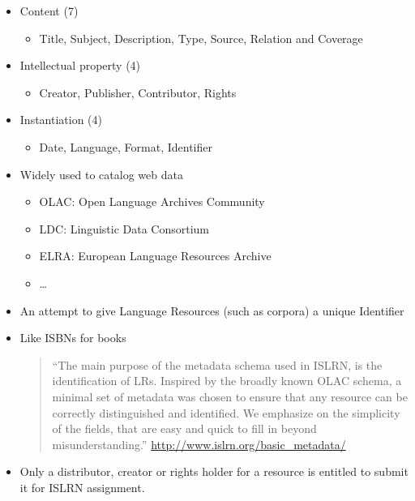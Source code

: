 \documentclass[a4paper,landscape,headrule,footrule,xetex]{foils}
\begin{document}
\MyLogo{}
\begin{itemize}
\item Content (7)
  \begin{itemize}
  \item Title, Subject, Description, Type, Source,
    Relation and Coverage
  \end{itemize}
\item Intellectual property (4)
  \begin{itemize}
  \item Creator, Publisher, Contributor, Rights
  \end{itemize}
\item Instantiation (4)
  \begin{itemize}
  \item Date, Language, Format, Identifier
  \end{itemize}
\end{itemize}
	


\begin{itemize}
\item Widely used to catalog web data
  \begin{itemize}
  \item OLAC: Open Language Archives Community
  \item LDC: Linguistic Data Consortium
  \item ELRA: European Language Resources Archive
  \item \ldots
  \end{itemize}
\end{itemize}

\begin{itemize}
\item An attempt to give Language Resources (such as corpora) a unique Identifier
\item Like ISBNs for books
  \begin{quote}
    ``The main purpose of the metadata schema used in ISLRN, is the
    identification of LRs. Inspired by the broadly known OLAC schema,
    a minimal set of metadata was chosen to ensure that any resource
    can be correctly distinguished and identified. We emphasize on the
    simplicity of the fields, that are easy and quick to fill in
    beyond misunderstanding.''
\hfill    \url{http://www.islrn.org/basic_metadata/}
  \end{quote}
  \item  Only a distributor, creator or rights holder for a resource is entitled to submit it for ISLRN assignment.
\end{itemize}
\end{document}
